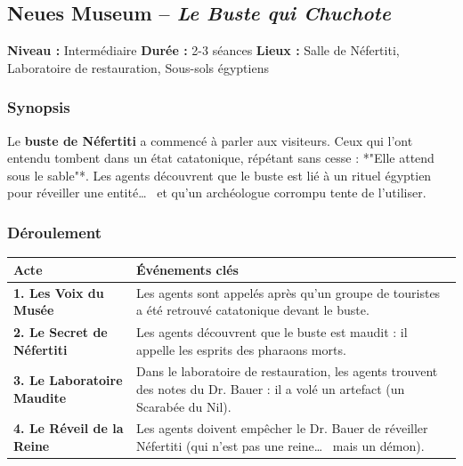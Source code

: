 \documentclass[10pt,a5paper,twoside]{book}
\begin{document}
\newpage

\subsection{Neues Museum -- \textit{Le Buste qui Chuchote}}

\begin{shaded}
	\textbf{Niveau :} Intermédiaire \quad
	\textbf{Durée :} 2-3 séances \quad
	\textbf{Lieux :} Salle de Néfertiti, Laboratoire de restauration, Sous-sols égyptiens
\end{shaded}

\subsubsection*{Synopsis}

Le \textbf{buste de Néfertiti} a commencé à parler aux visiteurs. Ceux qui l'ont entendu tombent dans un état catatonique, répétant sans cesse : *"Elle attend sous le sable"*. Les agents découvrent que le buste est lié à un rituel égyptien pour réveiller une entité\ldots~  et qu'un archéologue corrompu tente de l'utiliser.

\subsubsection*{Déroulement}
\begin{center}
	\begin{tabular}{|P{3cm}|P{9cm}|}
	\hline
	\textbf{Acte} 						& \textbf{Événements clés} \\ \hline
	\textbf{1. Les Voix du Musée} 		& Les agents sont appelés après qu'un groupe de touristes a été retrouvé catatonique devant le buste. \\ \hline
	\textbf{2. Le Secret de Néfertiti} 	& Les agents découvrent que le buste est maudit : il appelle les esprits des pharaons morts. \\ \hline
	\textbf{3. Le Laboratoire Maudite} 	& Dans le laboratoire de restauration, les agents trouvent des notes du Dr. Bauer : il a volé un artefact (un Scarabée du Nil). \\ \hline
	\textbf{4. Le Réveil de la Reine} 	& Les agents doivent empêcher le Dr. Bauer de réveiller Néfertiti (qui n'est pas une reine\ldots~  mais un démon). \\ \hline
	\end{tabular}
\end{center}
\end{document}
